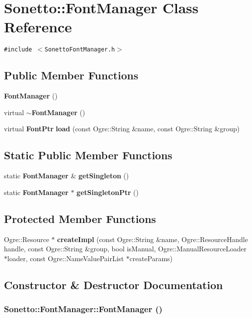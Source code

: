 \section{Sonetto::FontManager Class Reference}
\label{class_sonetto_1_1_font_manager}
{\tt \#include $<$SonettoFontManager.h$>$}

\subsection*{Public Member Functions}
\begin{CompactItemize}
\item 
{\bf FontManager} ()
\item 
virtual {\bf $\sim$FontManager} ()
\item 
virtual {\bf FontPtr} {\bf load} (const Ogre::String \&name, const Ogre::String \&group)
\end{CompactItemize}
\subsection*{Static Public Member Functions}
\begin{CompactItemize}
\item 
static {\bf FontManager} \& {\bf getSingleton} ()
\item 
static {\bf FontManager} $\ast$ {\bf getSingletonPtr} ()
\end{CompactItemize}
\subsection*{Protected Member Functions}
\begin{CompactItemize}
\item 
Ogre::Resource $\ast$ {\bf createImpl} (const Ogre::String \&name, Ogre::ResourceHandle handle, const Ogre::String \&group, bool isManual, Ogre::ManualResourceLoader $\ast$loader, const Ogre::NameValuePairList $\ast$createParams)
\end{CompactItemize}


\subsection{Constructor \& Destructor Documentation}
\subsubsection{\setlength{\rightskip}{0pt plus 5cm}Sonetto::FontManager::FontManager ()}\label{class_sonetto_1_1_font_manager_2c1dec94f4f03cc3733bfd101ab7f3a6}


